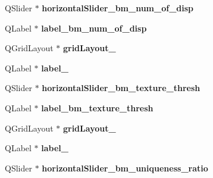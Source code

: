 \begin{DoxyCompactItemize}
\item 
\hypertarget{class_ui__stereo_match_param_form_a70bb71d924ceadf9a62718c287df76a2}{}Q\+Slider $\ast$ {\bfseries horizontal\+Slider\+\_\+bm\+\_\+num\+\_\+of\+\_\+disp}\label{class_ui__stereo_match_param_form_a70bb71d924ceadf9a62718c287df76a2}

\item 
\hypertarget{class_ui__stereo_match_param_form_a71fe94fd40b480223b2c72df998386dd}{}Q\+Label $\ast$ {\bfseries label\+\_\+bm\+\_\+num\+\_\+of\+\_\+disp}\label{class_ui__stereo_match_param_form_a71fe94fd40b480223b2c72df998386dd}

\item 
\hypertarget{class_ui__stereo_match_param_form_a666e5c548a04ca8d733282522ccf972b}{}Q\+Grid\+Layout $\ast$ {\bfseries grid\+Layout\+\_}\label{class_ui__stereo_match_param_form_a666e5c548a04ca8d733282522ccf972b}

\item 
\hypertarget{class_ui__stereo_match_param_form_ae3bad7c4b99ccf7f128b37c616ccb002}{}Q\+Label $\ast$ {\bfseries label\+\_}\label{class_ui__stereo_match_param_form_ae3bad7c4b99ccf7f128b37c616ccb002}

\item 
\hypertarget{class_ui__stereo_match_param_form_abb509d739bf22f4314cb758321fc98a6}{}Q\+Slider $\ast$ {\bfseries horizontal\+Slider\+\_\+bm\+\_\+texture\+\_\+thresh}\label{class_ui__stereo_match_param_form_abb509d739bf22f4314cb758321fc98a6}

\item 
\hypertarget{class_ui__stereo_match_param_form_ac2f87d9ef16caac9de2c9300deba0cee}{}Q\+Label $\ast$ {\bfseries label\+\_\+bm\+\_\+texture\+\_\+thresh}\label{class_ui__stereo_match_param_form_ac2f87d9ef16caac9de2c9300deba0cee}

\item 
\hypertarget{class_ui__stereo_match_param_form_a25addba2697915df9f5c13652977b308}{}Q\+Grid\+Layout $\ast$ {\bfseries grid\+Layout\+\_}\label{class_ui__stereo_match_param_form_a25addba2697915df9f5c13652977b308}

\item 
\hypertarget{class_ui__stereo_match_param_form_afe948e4a12e88c5e42761f7f41abfd75}{}Q\+Label $\ast$ {\bfseries label\+\_}\label{class_ui__stereo_match_param_form_afe948e4a12e88c5e42761f7f41abfd75}

\item 
\hypertarget{class_ui__stereo_match_param_form_ad0410d69d8e62e909c14513610f40562}{}Q\+Slider $\ast$ {\bfseries horizontal\+Slider\+\_\+bm\+\_\+uniqueness\+\_\+ratio}\label{class_ui__stereo_match_param_form_ad0410d69d8e62e909c14513610f40562}


\end{DoxyCompactItemize}
